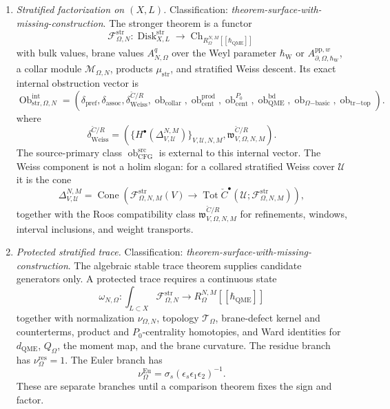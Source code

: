 \begin{enumerate}
  \item \emph{Stratified factorization on \((X,L)\).}
  Classification: \emph{theorem-surface-with-missing-construction}.
  The stronger theorem is a functor
  \[
    \mathcal F^{\mathrm{str}}_{\Omega,N}\colon
    \operatorname{Disk}^{\mathrm{str}}_{X,L}
    \to
    \operatorname{Ch}_{R_\Omega^{N,M}[[\hbar_{\mathrm{QME}}]]}
  \]
  with bulk values, brane values
  \(A^q_{N,\Omega}\) over the Weyl parameter \(\hbar_{\mathrm{W}}\) or
  \(A^{\mathrm{pp},w}_{\partial,\Omega,\hbar_{\mathrm{W}}}\), a collar module
  \(\mathcal M_{\Omega,N}\), products \(\mu_{\mathrm{str}}\), and
  stratified Weiss descent.  Its exact internal obstruction vector is
  \[
    \operatorname{Ob}^{\mathrm{int}}_{\mathrm{str},\Omega,N}
    =
    (\delta_{\mathrm{pref}},
     \delta_{\mathrm{assoc}},
     \delta_{\mathrm{Weiss}}^{\check C/R},
     \operatorname{ob}_{\mathrm{collar}},
     \operatorname{ob}^{\mathrm{prod}}_{\mathrm{cent}},
     \operatorname{ob}^{P_0}_{\mathrm{cent}},
     \operatorname{ob}^{\mathrm{bd}}_{\mathrm{QME}},
     \operatorname{ob}_{\Omega\mathrm{-basic}},
     \operatorname{ob}_{\mathrm{tr}\mathrm{-top}}).
  \]
  where
  \[
    \delta_{\mathrm{Weiss}}^{\check C/R}
    =
    \left(
      \{H^\bullet(\Delta^{N,M}_{V,\mathcal U})\}_{V,\mathcal U,N,M},
      \mathfrak w^{\check C/R}_{V,\Omega,N,M}
    \right).
  \]
  The source-primary class
  \(\operatorname{ob}^{\mathrm{src}}_{\mathrm{CFG}}\) is external to this
  internal vector.  The Weiss component is not a holim slogan: for a
  collared stratified Weiss cover \(\mathcal U\) it is the cone
  \[
    \Delta^{N,M}_{V,\mathcal U}
    =
    \operatorname{Cone}\left(
      \mathcal F^{\mathrm{str}}_{\Omega,N,M}(V)
      \to
      \operatorname{Tot}\check C^\bullet
      (\mathcal U;\mathcal F^{\mathrm{str}}_{\Omega,N,M})
    \right),
  \]
  together with the Roos compatibility class
  \(\mathfrak w^{\check C/R}_{V,\Omega,N,M}\) for refinements, windows,
  interval inclusions, and weight transports.

  \item \emph{Protected stratified trace.}
  Classification: \emph{theorem-surface-with-missing-construction}.
  The algebraic stable trace theorem supplies candidate generators only.
  A protected trace requires a continuous state
  \[
    \omega_{N,\Omega}\colon
    \int_{L\subset X}\mathcal F^{\mathrm{str}}_{\Omega,N}
    \to
    R_\Omega^{N,M}[[\hbar_{\mathrm{QME}}]]
  \]
  together with normalization \(\nu_{\Omega,N}\), topology
  \(\mathcal T_\Omega\), brane-defect kernel and counterterms, product
  and \(P_0\)-centrality homotopies, and Ward identities for
  \(d_{\mathrm{QME}}\), \(Q_\Omega\), the moment map, and the brane
  curvature.  The residue branch has
  \(\nu_\Omega^{\mathrm{res}}=1\).  The Euler branch has
  \[
    \nu_\Omega^{\mathrm{Eu}}
    =
    \sigma_s(\epsilon_s\epsilon_1\epsilon_2)^{-1}.
  \]
  These are separate branches until a comparison theorem fixes the sign
  and factor.


\end{enumerate}
